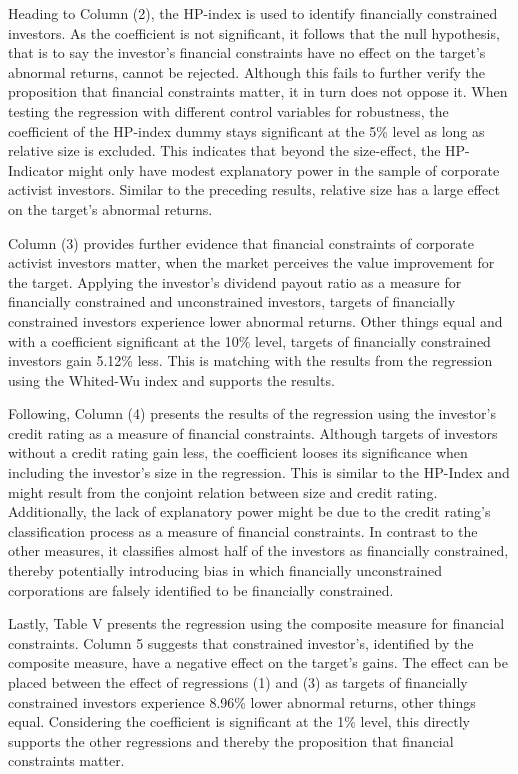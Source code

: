\documentclass[12pt]{article}
\begin{document}
Heading to Column (2), the HP-index is used to identify financially constrained investors. As the coefficient is not significant, it follows that the null hypothesis, that is to say the investor's financial constraints have no effect on the target's abnormal returns, cannot be rejected. Although this fails to further verify the proposition that financial constraints matter, it in turn does not oppose it. When testing the regression with different control variables for robustness, the coefficient of the HP-index dummy stays significant at the 5\% level as long as relative size is excluded. This indicates that beyond the size-effect, the HP-Indicator might only have modest explanatory power in the sample of corporate activist investors. Similar to the preceding results, relative size has a large effect on the target's abnormal returns.\par
Column (3) provides further evidence that financial constraints of corporate activist investors matter, when the market perceives the value improvement for the target. Applying the investor's dividend payout ratio as a measure for financially constrained and unconstrained investors, targets of financially constrained investors experience lower abnormal returns. Other things equal and with a coefficient significant at the 10\% level, targets of financially constrained investors gain 5.12\% less. This is matching with the results from the regression using the Whited-Wu index and supports the results.\par
Following, Column (4) presents the results of the regression using the investor's credit rating as a measure of financial constraints. Although targets of investors without a credit rating gain less, the coefficient looses its significance when including the investor's size in the regression. This is similar to the HP-Index and might result from the conjoint relation between size and credit rating. Additionally, the lack of explanatory power might be due to the credit rating's classification process as a measure of financial constraints. In contrast to the other measures, it classifies almost half of the investors as financially constrained, thereby potentially introducing bias in which financially unconstrained corporations are falsely identified to be financially constrained.\par
Lastly, Table V presents the regression using the composite measure for financial constraints. Column 5 suggests that constrained investor's, identified by the composite measure, have a negative effect on the target's gains. The effect can be placed between the effect of regressions (1) and (3) as targets of financially constrained investors experience 8.96\% lower abnormal returns, other things equal. Considering the coefficient is significant at the 1\% level, this directly supports the other regressions and thereby the proposition that financial constraints matter.\par
\end{document}
